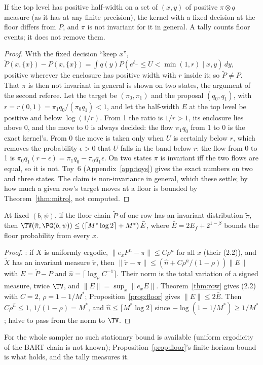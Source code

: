 \begin{proposition}\label{prop:fixedtop}
If the top level has positive half-width on a set of $(x,y)$ of positive $\pi\otimes q$ measure (as it has at any
finite precision), the kernel with a fixed decision at the floor differs from $P$, and $\pi$ is not invariant for
it in general. A tally counts floor events; it does not remove them.
\end{proposition}
\begin{proof}
With the fixed decision ``keep $x$'', $\widetilde P(x,\{x\})-P(x,\{x\})=\int q(y)P(e^{\ell_-}\le U<\min(1,r)\mid x,y)\,dy$,
positive wherever the enclosure has positive width with $r$ inside it; so $\widetilde P\ne P$. That $\pi$ is then
not invariant in general is shown on two states, the argument of the second referee. Let the target be
$(\pi_0,\pi_1)$ and the proposal $(q_0,q_1)$, with $r=r(0,1)=\pi_1q_0/(\pi_0q_1)<1$, and let the half-width $E$ at
the top level be positive and below $\log(1/r)$. From 1 the ratio is $1/r>1$, its enclosure lies above 0, and the
move to 0 is always decided: the flow $\pi_1q_0$ from 1 to 0 is the exact kernel's. From 0 the move is taken
only when $U$ is certainly below $r$, which removes the probability $\epsilon>0$ that $U$ falls in the band below
$r$: the flow from 0 to 1 is $\pi_0q_1(r-\epsilon)=\pi_1q_0-\pi_0q_1\epsilon$. On two states $\pi$ is invariant iff
the two flows are equal, so it is not. Toy~6 (Appendix~\ref{app:toys}) gives the exact numbers on two and three
states. The claim is non-invariance in general, which these settle; by how much a given row's target moves at a
floor is bounded by Theorem~\ref{thm:mitro}, not computed.
\end{proof}

\begin{theorem}\label{thm:mitro}
At fixed $(b,\psi)$, if the floor chain $\widetilde P$ of one row has an invariant distribution $\tilde\pi$, then
$\TV(\tilde\pi,\PG(b,\psi))\le(\lceil M^*\log2\rceil+M^*)\,\bar E$, where $\bar E=2E_f+2^{1-\beta}$ bounds the
floor probability from every $x$.
\end{theorem}
\begin{proof}
\cite[Cor.~3.1, eq.~(3.8)]{mitro}: if $X$ is uniformly ergodic, $\|e_xP^n-\pi\|\le C\rho^n$ for all $x$ (their
(2.2)), and $\widetilde X$ has an invariant measure $\tilde\pi$, then $\|\tilde\pi-\pi\|\le(\hat n+C\rho^{\hat
n}/(1-\rho))\|E\|$ with $E=\widetilde P-P$ and $\hat n=\lceil\log_\rho C^{-1}\rceil$. Their norm is the total
variation of a signed measure, twice $\TV$, and $\|E\|=\sup_x\|e_xE\|$. Theorem~\ref{thm:row} gives (2.2) with
$C=2$, $\rho=1-1/M^*$; Proposition~\ref{prop:floor} gives $\|E\|\le2\bar E$. Then $C\rho^{\hat n}\le1$,
$1/(1-\rho)=M^*$, and $\hat n\le\lceil M^*\log2\rceil$ since $-\log(1-1/M^*)\ge1/M^*$; halve to pass from the
norm to $\TV$.
\end{proof}
For the whole sampler no such stationary bound is available (uniform ergodicity of the BART chain is not known);
Proposition~\ref{prop:floor}'s finite-horizon bound is what holds, and the tally measures it.

